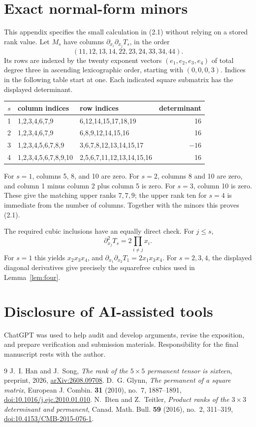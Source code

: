 \documentclass[11pt]{amsart}
\theoremstyle{definition}
\numberwithin{equation}{section}
\begin{document}
\section{Exact normal-form minors}\label{app:minors}
This appendix specifies the small calculation in (2.1) without relying on
a stored rank value. Let \(M_s\) have columns
\(\partial_{x_i}\partial_{x_j}T_s\), in the order
\[
 (11,12,13,14,22,23,24,33,34,44).
\]
Its rows are indexed by the twenty exponent vectors
\((e_1,e_2,e_3,e_4)\) of total degree three in ascending lexicographic
order, starting with \((0,0,0,3)\). Indices in the following table start
at one. Each indicated square submatrix has the displayed determinant.
\begin{center}
\small
\begin{tabular}{@{}cllr@{}}
\toprule
\(s\)&column indices&row indices&determinant\\\midrule
1&1,2,3,4,6,7,9&6,12,14,15,17,18,19&16\\
2&1,2,3,4,6,7,9&6,8,9,12,14,15,16&16\\
3&1,2,3,4,5,6,7,8,9&3,6,7,8,12,13,14,15,17&\(-16\)\\
4&1,2,3,4,5,6,7,8,9,10&2,5,6,7,11,12,13,14,15,16&16\\\bottomrule
\end{tabular}
\end{center}
For \(s=1\), columns 5, 8, and 10 are zero. For \(s=2\), columns 8
and 10 are zero, and column 1 minus column 2 plus column 5 is zero.
For \(s=3\), column 10 is zero. These give the matching upper ranks
\(7,7,9\); the upper rank ten for \(s=4\) is immediate from the number
of columns. Together with the minors this proves (2.1).

The required cubic inclusions have an equally direct check. For
\(j\le s\),
\[
 \partial_{x_j}^2T_s=2\prod_{i\ne j}x_i.
\]
For \(s=1\) this yields \(x_2x_3x_4\), and
\(\partial_{x_1}\partial_{x_2}T_1=2x_1x_3x_4\).
For \(s=2,3,4\), the displayed diagonal derivatives give precisely the
squarefree cubics used in Lemma~\ref{lem:four}.

\section*{Disclosure of AI-assisted tools}
ChatGPT was used to help audit and develop arguments, revise the exposition,
and prepare verification and submission materials. Responsibility for the
final manuscript rests with the author.

\begin{thebibliography}{9}
J.~I. Han and J.~Song, \emph{The rank of the \(5\times5\) permanent
tensor is sixteen}, preprint, 2026,
\href{https://arxiv.org/abs/2608.09708}{arXiv:2608.09708}.
D.~G. Glynn, \emph{The permanent of a square matrix},
European J. Combin. \textbf{31} (2010), no.~7, 1887--1891,
\href{https://doi.org/10.1016/j.ejc.2010.01.010}{doi:10.1016/j.ejc.2010.01.010}.
N.~Ilten and Z.~Teitler,
\emph{Product ranks of the \(3\times3\) determinant and permanent},
Canad. Math. Bull. \textbf{59} (2016), no.~2, 311--319,
\href{https://doi.org/10.4153/CMB-2015-076-1}{doi:10.4153/CMB-2015-076-1}.
\end{thebibliography}
\end{document}
